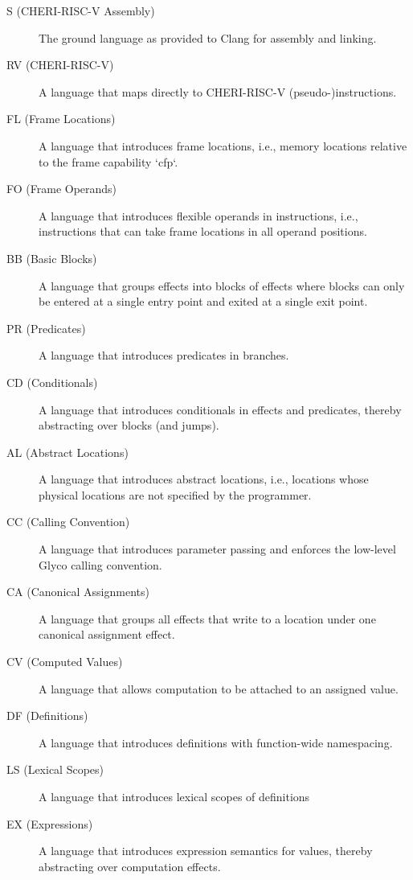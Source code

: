 
\begin{description}
	\item[S (CHERI-RISC-V Assembly)] The ground language as provided to Clang for assembly and linking.
	\item[RV (CHERI-RISC-V)] A language that maps directly to CHERI-RISC-V (pseudo-)instructions.
	\item[FL (Frame Locations)] A language that introduces frame locations, i.e., memory locations relative to the frame capability `cfp`.
	\item[FO (Frame Operands)] A language that introduces flexible operands in instructions, i.e., instructions that can take frame locations in all operand positions.
	\item[BB (Basic Blocks)] A language that groups effects into blocks of effects where blocks can only be entered at a single entry point and exited at a single exit point.
	\item[PR (Predicates)] A language that introduces predicates in branches.
	\item[CD (Conditionals)] A language that introduces conditionals in effects and predicates, thereby abstracting over blocks (and jumps).
	\item[AL (Abstract Locations)] A language that introduces abstract locations, i.e., locations whose physical locations are not specified by the programmer.
	\item[CC (Calling Convention)] A language that introduces parameter passing and enforces the low-level Glyco calling convention.
	\item[CA (Canonical Assignments)] A language that groups all effects that write to a location under one canonical assignment effect.
	\item[CV (Computed Values)] A language that allows computation to be attached to an assigned value.
	\item[DF (Definitions)] A language that introduces definitions with function-wide namespacing.
	\item[LS (Lexical Scopes)] A language that introduces lexical scopes of definitions
	\item[EX (Expressions)] A language that introduces expression semantics for values, thereby abstracting over computation effects.
\end{description}